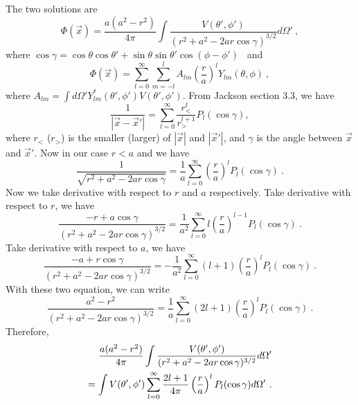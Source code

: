\documentclass[12pt]{article}
\begin{document}
\newpage
{}
The two solutions are
\begin{equation}
    \Phi(\vec x) = \frac{a(a^2 - r^2)}{4\pi} \int \frac{V(\theta', \phi')}{(r^2 + a^2 - 2ar \cos\gamma)^{3/2}} d \Omega'~,
\end{equation}
where $\cos \gamma = \cos \theta \cos \theta' + \sin\theta \sin \theta' \cos(\phi - \phi')$~ and
\begin{equation}
    \Phi(\vec x) = \sum_{l=0}^\infty \sum_{m=-l}^l A_{lm} \left(\frac r a\right)^l Y_{lm}(\theta, \phi)~,
\end{equation}
where $A_{lm} = \int d \Omega' Y^*_{lm}(\theta', \phi') V(\theta', \phi')$.
From Jackson section 3.3, we have
\begin{equation}
    \frac{1}{|\vec x - \vec x'|} = \sum_{l = 0}^\infty \frac{r^l_<}{r^{l+1}_>} P_l (\cos \gamma),
\end{equation}
where $r_<$ ($r_>$) is the smaller (larger) of $|\vec x|$ and $|\vec x'|$, and $\gamma$ is the angle between $\vec x$ and $\vec x'$. Now in our case $r < a$ and we have
\begin{equation}
    \frac{1}{\sqrt{r^2 + a^2 - 2a r \cos \gamma}} = \frac 1a\sum_{l = 0}^\infty \left(\frac{r}{a}\right)^l P_l(\cos \gamma)~.
\end{equation}
Now we take derivative with respect to $r$ and $a$ respectively.
Take derivative with respect to $r$, we have
\begin{equation}
    \frac{-r + a\cos \gamma}{(r^2 + a^2 - 2ar \cos \gamma)^{3/2}} = \frac {1}{a^2} \sum_{l = 0}^\infty l \left(\frac{r}{a}\right)^{l-1} P_l(\cos \gamma)~.
\end{equation}
Take derivative with respect to $a$, we have
\begin{equation}
    \frac{-a + r\cos \gamma}{(r^2 + a^2 - 2 a r \cos \gamma)^{3/2}} = -\frac {1}{a^2} \sum_{l = 0}^\infty (l+1) \left(\frac{r}{a}\right)^{l} P_l(\cos \gamma)~.
\end{equation}
With these two equation, we can write
\begin{equation}
    \frac{a^2 - r^2}{ (r^2 + a^2 - 2ar \cos \gamma)^{3/2}} = \frac 1 a\sum_{l = 0}^\infty(2l + 1) \left(\frac{r}{a}\right)^l P_l(\cos \gamma)~.
\end{equation}
Therefore,
\begin{align}
    \frac{a(a^2 - r^2)}{4\pi} \int \frac{V(\theta', \phi')}{(r^2 + a^2 - 2ar \cos\gamma)^{3/2}} d \Omega' \cr
    = \int V(\theta', \phi') \sum_{l = 0}^\infty \frac{2l+1}{4\pi} \left(\frac{r}{a}\right)^l P_l(\cos \gamma) d \Omega'~.
\end{align}
\end{document}
